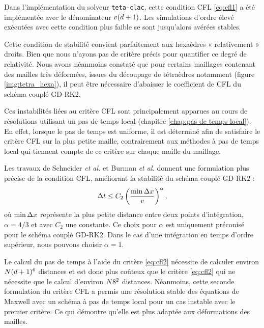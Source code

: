 \begin{remark}
	Dans l'implémentation du solveur \texttt{teta-clac},
	cette condition CFL \eqref{eq:cfl1} a été implémentée avec le dénominateur
	$v (d + 1)$. Les simulations d'ordre élevé exécutées avec
	cette condition plus faible se sont jusqu'alors avérées stables.
\end{remark}

Cette condition de stabilité convient parfaitement aux hexaèdres « relativement »
droits. Bien que nous n'ayons pas de critère précis pour quantifier ce degré de relativité.
Nous avons néanmoins constaté que pour certains maillages contenant des mailles très déformées,
issues du découpage de tétraèdres notamment (figure \ref{img:tetra_hexa}), il peut être nécessaire d'abaisser
le coefficient de CFL du schéma couplé GD-RK$2$.

Ces instabilités liées au critère CFL sont principalement apparues au cours de résolutions
utilisant un pas de temps local (chapitre \ref{chap:pas de temps local}). En effet, lorsque le pas de temps est uniforme, il est déterminé
afin de satisfaire le critère CFL sur la plus petite maille, contrairement aux méthodes à pas de temps
local qui tiennent compte de ce critère sur chaque maille du maillage.

Les travaux de Schneider \textit{et al.} \cite{schneider2013cfl} et
Burman \textit{et al.} \cite{doi:10.1137/090757940}
donnent une formulation plus précise de la condition CFL, améliorant
la stabilité du schéma couplé GD-RK$2$ :
\begin{align}
	\Delta t \le C_2 \left(\frac{\min \Delta x}{v}\right)^{\alpha}
	\label{eq:cfl2} ,
\end{align}
où $\min \Delta x$ représente la plus petite distance entre deux
points d'intégration, $\alpha = 4/3$ et avec $C_2$ une constante.
Ce choix pour $\alpha$ est uniquement préconisé pour le schéma couplé
GD-RK$2$. Dans le cas d'une intégration en temps d'ordre supérieur,
nous pouvons choisir $\alpha = 1$.


Le calcul du pas de temps à l'aide du critère \eqref{eq:cfl2} nécessite de calculer environ
$N (d + 1)^6$ distances et est donc plus coûteux que le critère \eqref{eq:cfl2}
qui ne nécessite que le calcul d'environ $N 8^2$ distances.
Néanmoins, cette seconde formulation du critère CFL a permis une résolution stable des équations
de Maxwell avec un schéma à pas de temps local pour un cas instable avec le premier critère.
Ce qui démontre qu'elle est plus adaptée aux déformations des mailles.
\\



